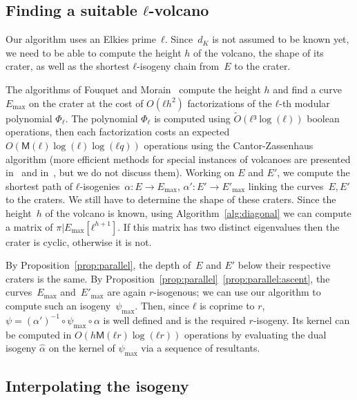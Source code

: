 \documentclass{lms}
\def\cout#1{\mathsf{#1}}
\newcommand{\tildO}{\tilde{O}}
\newcommand{\MM}{\cout{M}}
\begin{document}
\subsection{Finding a suitable $ℓ$-volcano}
\label{sub:shape-volcano}

Our algorithm uses an Elkies prime~$ℓ$.  Since~$d_K$ is not assumed to
be known yet, we need to be able to compute the height $h$ of the
volcano, the shape of its crater, as well as the shortest $ℓ$-isogeny
chain from~$E$ to the crater.

The algorithms of Fouquet and Morain~\cite{volcano} compute the height
$h$ and find a curve $E_{\max}$ on the crater at the cost of $O(ℓh^2)$
factorizations of the $ℓ$-th modular polynomial $Φ_ℓ$. The polynomial
$Φ_ℓ$ is computed using $\tildO(ℓ³\log(ℓ))$ boolean operations, then
each factorization costs an expected $O(\MM(ℓ)\log(ℓ)\log(ℓq))$
operations using the Cantor-Zassenhaus algorithm (more efficient
methods for special instances of volcanoes are presented
in~\cite{MiretMRV05} and in~\cite{ionica+joux13}, but we do not
discuss them). Working on $E$ and $E'$, we compute the shortest path
of $ℓ$-isogenies~$α: E → E_{\max}$, $α': E' → E'_{\max}$ linking the
curves~$E, E'$ to the craters.
We still have to determine the
shape of these craters.  Since the height~$h$ of the volcano is known,
using Algorithm~\ref{alg:diagonal} we can compute a matrix of
$π|E_{\max}[ℓ^{h+1}]$.  If this matrix has two distinct eigenvalues then the
crater is cyclic, otherwise it is not.


By Proposition~\ref{prop:parallel}, the depth of~$E$ and $E'$ below
their respective craters is the same.  By
Proposition~\ref{prop:parallel}~\ref{prop:parallel:ascent}, the
curves~$E_{\max}$ and~$E'_{\max}$ are again $r$-isogenous; we can use
our algorithm to compute such an isogeny~$ψ_{\max}$.  Then, 
since $ℓ$ is coprime to $r$, $ψ =
(α')^{-1} ∘ ψ_{\max} ∘ α$ is well defined and is the required $r$-isogeny.
Its kernel can
be computed in $O(h\MM(ℓr)\log(ℓr))$ operations by evaluating the dual isogeny $\hat{α}$
on the kernel of $ψ_{\max}$ via a sequence of resultants.

\subsection{Interpolating the isogeny}
\label{sub:final-interp}
\end{document}
